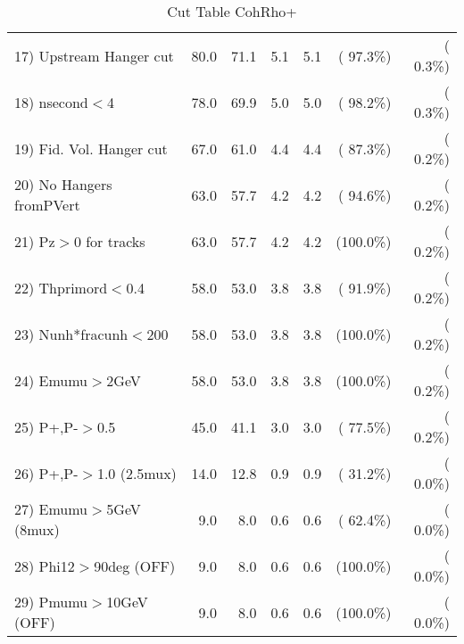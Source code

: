 \begin{table}[h!]
\begin{tabular}{||l||r|r|r|r|r|r||}
 17) Upstream Hanger cut  &         80.0 &         71.1 &          5.1 &          5.1 & ( 97.3\%) & (  0.3\%) \\
 18) nsecond$<$4          &         78.0 &         69.9 &          5.0 &          5.0 & ( 98.2\%) & (  0.3\%) \\
 19) Fid. Vol. Hanger cut &         67.0 &         61.0 &          4.4 &          4.4 & ( 87.3\%) & (  0.2\%) \\
 20) No Hangers fromPVert &         63.0 &         57.7 &          4.2 &          4.2 & ( 94.6\%) & (  0.2\%) \\
 21) Pz$>$0 for tracks    &         63.0 &         57.7 &          4.2 &          4.2 & (100.0\%) & (  0.2\%) \\
 22) Thprimord$<$0.4      &         58.0 &         53.0 &          3.8 &          3.8 & ( 91.9\%) & (  0.2\%) \\
 23) Nunh*fracunh$<$200   &         58.0 &         53.0 &          3.8 &          3.8 & (100.0\%) & (  0.2\%) \\
 24) Emumu$>$2GeV         &         58.0 &         53.0 &          3.8 &          3.8 & (100.0\%) & (  0.2\%) \\
 25) P+,P-$>$0.5          &         45.0 &         41.1 &          3.0 &          3.0 & ( 77.5\%) & (  0.2\%) \\
 26) P+,P-$>$1.0 (2.5mux) &         14.0 &         12.8 &          0.9 &          0.9 & ( 31.2\%) & (  0.0\%) \\
 27) Emumu$>$5GeV  (8mux) &          9.0 &          8.0 &          0.6 &          0.6 & ( 62.4\%) & (  0.0\%) \\
 28) Phi12$>$90deg  (OFF) &          9.0 &          8.0 &          0.6 &          0.6 & (100.0\%) & (  0.0\%) \\
 29) Pmumu$>$10GeV  (OFF) &          9.0 &          8.0 &          0.6 &          0.6 & (100.0\%) & (  0.0\%) \\
 \hline
 \hline
 \end{tabular}
 \caption{Cut Table  CohRho+  }
 \label{tab-cutcohjpsi-mumu_anumunc}
 \end{table}
